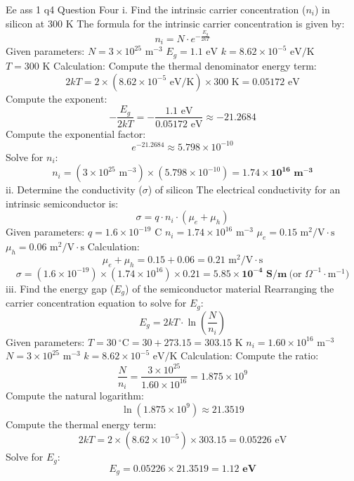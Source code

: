 Ee ass 1 q4
Question Four
i. Find the intrinsic carrier concentration ($n_i$) in silicon at $300\text{ K}$
The formula for the intrinsic carrier concentration is given by:
$$n_i = N \cdot e^{-\frac{E_g}{2kT}}$$ 
Given parameters:
$N = 3 \times 10^{25}\text{ m}^{-3}$
$E_g = 1.1\text{ eV}$
$k = 8.62 \times 10^{-5}\text{ eV/K}$
$T = 300\text{ K}$
Calculation:
Compute the thermal denominator energy term:
$$2kT = 2 \times (8.62 \times 10^{-5}\text{ eV/K}) \times 300\text{ K} = 0.05172\text{ eV}$$ 
Compute the exponent:
$$-\frac{E_g}{2kT} = -\frac{1.1\text{ eV}}{0.05172\text{ eV}} \approx -21.2684$$ 
Compute the exponential factor:
$$e^{-21.2684} \approx 5.798 \times 10^{-10}$$ 
Solve for $n_i$:
$$n_i = (3 \times 10^{25}\text{ m}^{-3}) \times (5.798 \times 10^{-10}) = \mathbf{1.74 \times 10^{16}\text{ m}^{-3}}$$ 
ii. Determine the conductivity ($\sigma$) of silicon
The electrical conductivity for an intrinsic semiconductor is:
$$\sigma = q \cdot n_i \cdot (\mu_e + \mu_h)$$ 
Given parameters:
$q = 1.6 \times 10^{-19}\text{ C}$
$n_i = 1.74 \times 10^{16}\text{ m}^{-3}$
$\mu_e = 0.15\text{ m}^2/\text{V}\cdot\text{s}$
$\mu_h = 0.06\text{ m}^2/\text{V}\cdot\text{s}$
Calculation:
$$\mu_e + \mu_h = 0.15 + 0.06 = 0.21\text{ m}^2/\text{V}\cdot\text{s}$$ 
$$\sigma = (1.6 \times 10^{-19}) \times (1.74 \times 10^{16}) \times 0.21 = \mathbf{5.85 \times 10^{-4}\text{ S/m}}\ \text{(or }\Omega^{-1}\cdot\text{m}^{-1}\text{)}$$ 
iii. Find the energy gap ($E_g$) of the semiconductor material
Rearranging the carrier concentration equation to solve for $E_g$:
$$E_g = 2kT \cdot \ln\left(\frac{N}{n_i}\right)$$ 
Given parameters:
$T = 30\ ^\circ\text{C} = 30 + 273.15 = 303.15\text{ K}$
$n_i = 1.60 \times 10^{16}\text{ m}^{-3}$
$N = 3 \times 10^{25}\text{ m}^{-3}$
$k = 8.62 \times 10^{-5}\text{ eV/K}$
Calculation:
Compute the ratio:
$$\frac{N}{n_i} = \frac{3 \times 10^{25}}{1.60 \times 10^{16}} = 1.875 \times 10^9$$ 
Compute the natural logarithm:
$$\ln(1.875 \times 10^9) \approx 21.3519$$ 
Compute the thermal energy term:
$$2kT = 2 \times (8.62 \times 10^{-5}) \times 303.15 = 0.05226\text{ eV}$$ 
Solve for $E_g$:
$$E_g = 0.05226 \times 21.3519 = \mathbf{1.12\text{ eV}}$$
